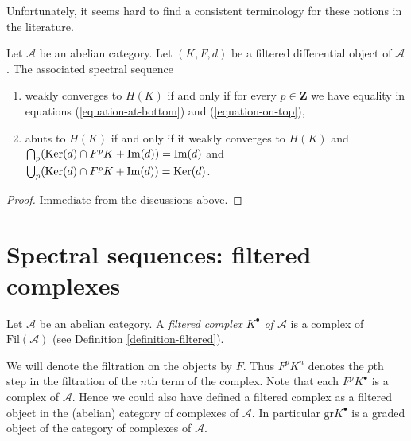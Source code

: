 \noindent
Unfortunately, it seems hard to find a consistent terminology for these
notions in the literature.

\begin{lemma}
\label{lemma-filtered-differential-ss-converges}
Let $\mathcal{A}$ be an abelian category.
Let $(K, F, d)$ be a filtered differential object of $\mathcal{A}$.
The associated spectral sequence
\begin{enumerate}
\item weakly converges to $H(K)$ if and only if for every
$p \in \mathbf{Z}$ we have equality in equations
(\ref{equation-at-bottom}) and (\ref{equation-on-top}),
\item abuts to $H(K)$ if and only if it weakly converges to $H(K)$ and
$\bigcap_p (\mathop{\mathrm{Ker}}(d) \cap F^pK + \mathop{\mathrm{Im}}(d)) = \mathop{\mathrm{Im}}(d)$
and $\bigcup_p (\mathop{\mathrm{Ker}}(d) \cap F^pK + \mathop{\mathrm{Im}}(d)) = \mathop{\mathrm{Ker}}(d)$.
\end{enumerate}
\end{lemma}

\begin{proof}
Immediate from the discussions above.
\end{proof}














\section{Spectral sequences: filtered complexes}
\label{section-filtered-complex}

\begin{definition}
\label{definition-filtered-complex}
Let $\mathcal{A}$ be an abelian category.
A {\it filtered complex $K^\bullet$ of $\mathcal{A}$}
is a complex of $\text{Fil}(\mathcal{A})$ (see
Definition \ref{definition-filtered}).
\end{definition}

\noindent
We will denote the filtration on the objects by $F$. Thus
$F^pK^n$ denotes the $p$th step in the filtration of the $n$th term of the
complex. Note that each $F^pK^\bullet$ is a complex of $\mathcal{A}$.
Hence we could also have defined a filtered complex as a filtered object
in the (abelian) category of complexes of $\mathcal{A}$.
In particular $\text{gr} K^\bullet$ is a graded object of the
category of complexes of $\mathcal{A}$.

